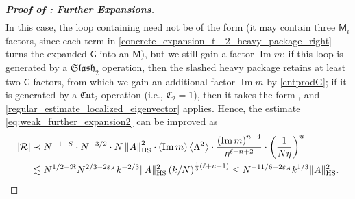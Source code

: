 \documentclass[10pt,reqno]{amsart}
\numberwithin{equation}{section}
\numberwithin{figure}{section}
\theoremstyle{plain} %
\theoremstyle{definition} %
\newcommand{\wt}{\widetilde}
\renewcommand{\txt}[1]{\text{\rm{#1}}}
\newcommand{\cR}{{\mathcal R}}
\newcommand{\fR}{\mathfrak R}
\newcommand{\fC}{\mathfrak C}
\newcommand{\sG}{\mathsf G}
\newcommand{\sM}{\mathsf M}
\renewcommand{\leq}{\le}
\newcommand{\p}[1]{({#1})}
\newcommand{\pa}[1]{\left({#1}\right)}
\newcommand{\absa}[1]{\left\lvert #1 \right\rvert}
\newcommand{\norm}[1]{\lVert #1 \rVert}
\newcommand{\norma}[1]{\left\lVert #1 \right\rVert}
\newcommand{\avg}[1]{\langle #1 \rangle}
\newcommand{\avga}[1]{\left\langle #1 \right\rangle}
\DeclareMathOperator{\im}{\mathrm{Im}}
\newcommand{\tLambda}{{\wt{\Lambda}}}
\newcommand{\fcut}[1]{\mathfrak{Cut}_{#1}}
\newcommand{\fslash}[1]{\mathfrak{Slash}_{#1}}
\newcommand{\HS}{\txt{HS}}
\newcommand{\tl}{\tLambda}
\newcommand{\mm}{\ell}
\numberwithin{equation}{section}
\begin{document}
\begin{proof}[\bf Proof of : Further Expansions]
\begin{equation}
\begin{aligned}
            \end{aligned}
        \end{equation}
        In this case, the loop containing \smash{$\tl_2$} need not be of the form \smash{$\avg{\sM_1\tl_2\sM_0 E_x}$} (it may contain three $\sM_i$ factors, since each term in \eqref{concrete_expansion_tl_2_heavy_package_right} turns the expanded $\sG$ into an $\sM$), but we still gain a factor $\im m$: if this loop is generated by a $\fslash{2}$ operation, then the slashed heavy package retains at least two $\sG$ factors, from which we gain an additional factor $\im m$ by \eqref{entprodG}; if it is generated by a $\fcut{2}$ operation (i.e., $\fC_2=1$), then it takes the form \smash{$\avg{\sM_1\tl_2\sM_0 E_y}$}, and \eqref{regular_estimate_localized_eigenvector} applies. 
        Hence, the estimate \eqref{eq:weak_further_expansion2} can be improved as
        \begin{equation}\nonumber
            \begin{aligned}
                \absa{\cR}&\prec N^{-1-S}\cdot N^{-3/2}\cdot N\norma{A}_{\HS}^2\cdot \p{\im m} \avga{\Lambda^2}\cdot \frac{\pa{\im m}^{n-4}}{\eta^{\mm-n+2}}\cdot \pa{\frac{1}{N\eta}}^{u}\\
                &\lesssim N^{1/2-\fR}N^{2/3-2\varepsilon_A}k^{-2/3}\norm{A}_{\HS}^2\pa{k/N}^{\frac13(\mm+u-1)}\leq N^{-11/6-2\varepsilon_A}k^{1/3}\norm{A}_{\HS}^2. %
            \end{aligned}
        \end{equation}
        

\end{proof}
\end{document}
